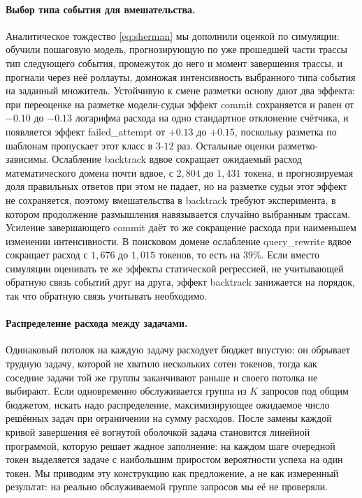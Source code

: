 \documentclass[11pt]{article}
\begin{document}
\paragraph{Выбор типа события для вмешательства.} Аналитическое тождество \eqref{eq:sherman} мы дополнили оценкой по симуляции: обучили пошаговую модель, прогнозирующую по уже прошедшей части трассы тип следующего события, промежуток до него и момент завершения трассы, и прогнали через неё роллауты, домножая интенсивность выбранного типа события на заданный множитель. Устойчивую к смене разметки основу дают два эффекта: при переоценке на разметке модели-судьи эффект \textsf{commit} сохраняется и равен от $-0.10$ до $-0.13$ логарифма расхода на одно стандартное отклонение счётчика, и появляется эффект \textsf{failed\_attempt} от $+0.13$ до $+0.15$, поскольку разметка по шаблонам пропускает этот класс в $3$-$12$ раз. Остальные оценки разметко-зависимы. Ослабление \textsf{backtrack} вдвое сокращает ожидаемый расход математического домена почти вдвое, с $2{,}804$ до $1{,}431$ токена, и прогнозируемая доля правильных ответов при этом не падает, но на разметке судьи этот эффект не сохраняется, поэтому вмешательства в \textsf{backtrack} требуют эксперимента, в котором продолжение размышления навязывается случайно выбранным трассам. Усиление завершающего \textsf{commit} даёт то же сокращение расхода при наименьшем изменении интенсивности. В поисковом домене ослабление \textsf{query\_rewrite} вдвое сокращает расход с $1{,}676$ до $1{,}015$ токенов, то есть на $39\%$. Если вместо симуляции оценивать те же эффекты статической регрессией, не учитывающей обратную связь событий друг на друга, эффект \textsf{backtrack} занижается на порядок, так что обратную связь учитывать необходимо.

\paragraph{Распределение расхода между задачами.} Одинаковый потолок на каждую задачу расходует бюджет впустую: он обрывает трудную задачу, которой не хватило нескольких сотен токенов, тогда как соседние задачи той же группы заканчивают раньше и своего потолка не выбирают. Если одновременно обслуживается группа из $K$ запросов под общим бюджетом, искать надо распределение, максимизирующее ожидаемое число решённых задач при ограничении на сумму расходов. После замены каждой кривой завершения её вогнутой оболочкой задача становится линейной программой, которую решает жадное заполнение: на каждом шаге очередной токен выделяется задаче с наибольшим приростом вероятности успеха на один токен. Мы приводим эту конструкцию как предложение, а не как измеренный результат: на реально обслуживаемой группе запросов мы её не проверяли.
\end{document}
